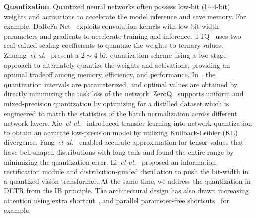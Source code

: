\documentclass[10pt,twocolumn,letterpaper]{article}
\begin{document}
\textbf{Quantization}. Quantized neural networks often possess low-bit (1$\sim$4-bit) weights and activations to accelerate the model inference and save memory. 
%
For example, DoReFa-Net~\cite{zhou2016dorefa} exploits convolution kernels with low bit-width parameters and gradients to accelerate training and inference. 
%
TTQ~\cite{zhu2016trained} uses two real-valued scaling coefficients to quantize the weights to ternary values.
%
Zhuang~\textit{et al.}~\cite{Zhuang_2018_CVPR} present a $2\!\sim\!4$-bit quantization scheme using a two-stage approach to alternately quantize the weights and activations, providing an optimal tradeoff among memory, efficiency, and performance. 
%
In~\cite{jung2019learning}, the quantization intervals are parameterized, and optimal values are obtained by directly minimizing the task loss of the network. %
%
ZeroQ~\cite{cai2020zeroq} supports uniform and mixed-precision quantization by optimizing for a distilled dataset which is engineered to match the statistics of the batch normalization across different network layers. 
%
Xie~\textit{et al.}~\cite{xie2020deep} introduced transfer learning into network quantization to obtain an accurate low-precision model by utilizing Kullback-Leibler (KL) divergence.
%
Fang~\textit{et al.}~\cite{fang2020post} enabled accurate approximation for tensor values that have bell-shaped distributions with long tails and found the entire range by minimizing the quantization error. 
Li~\textit{et al.}~\cite{li2022q} proposed an information rectification module and distribution-guided distillation to push the bit-width in a quantized vision transformer. At the same time, we address the quantization in DETR from the IB principle.  
%
The architectural design has also drawn increasing attention using extra shortcut~\cite{liu2018bi}, and parallel parameter-free shortcuts~\cite{liu2020reactnet} for example.
\end{document}
